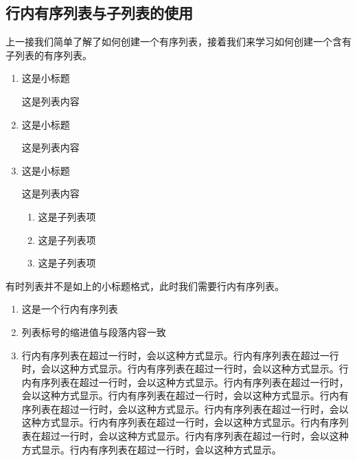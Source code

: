 \documentclass{bjfu}
\begin{document}
\subsection{行内有序列表与子列表的使用}
上一接我们简单了解了如何创建一个有序列表，接着我们来学习如何创建一个含有子列表的有序列表。
\begin{enumerate}[labelsep = .5em, leftmargin = 0pt, itemindent = 3em]
    \item 这是小标题 %
    
    \setlength{\parindent}{2em}这是列表内容

    \item 这是小标题 %
    
    \setlength{\parindent}{2em}这是列表内容

    \item 这是小标题 %
    
    \setlength{\parindent}{2em}这是列表内容
    \begin{enumerate}[itemindent=2em]
        \item 这是子列表项 
        \item 这是子列表项 
        \item 这是子列表项 
    \end{enumerate}
\end{enumerate}
有时列表并不是如上的小标题格式，此时我们需要行内有序列表。
\begin{enumerate}[fullwidth,itemindent=2em]
    \item 这是一个行内有序列表
    \item 列表标号的缩进值与段落内容一致
    \item 行内有序列表在超过一行时，会以这种方式显示。行内有序列表在超过一行时，会以这种方式显示。行内有序列表在超过一行时，会以这种方式显示。行内有序列表在超过一行时，会以这种方式显示。行内有序列表在超过一行时，会以这种方式显示。行内有序列表在超过一行时，会以这种方式显示。行内有序列表在超过一行时，会以这种方式显示。行内有序列表在超过一行时，会以这种方式显示。行内有序列表在超过一行时，会以这种方式显示。行内有序列表在超过一行时，会以这种方式显示。行内有序列表在超过一行时，会以这种方式显示。行内有序列表在超过一行时，会以这种方式显示。
\end{enumerate}
\end{document}
